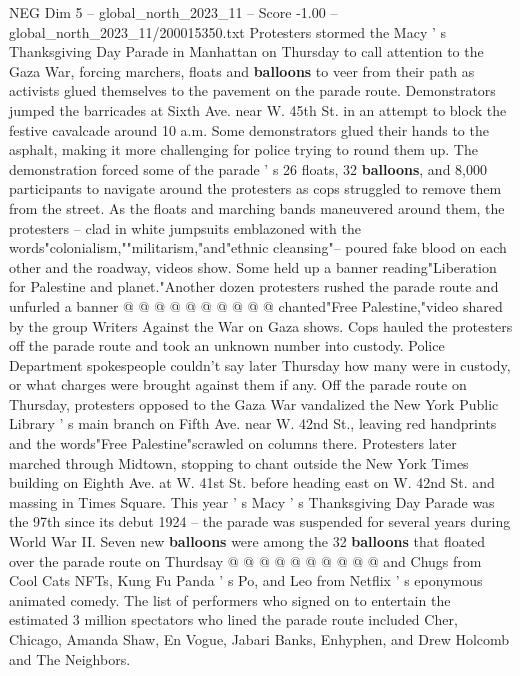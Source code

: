 \begin{textsample}{NEG Dim 5 – global\_north\_2023\_11 – Score -1.00 – global\_north\_2023\_11/200015350.txt}  \label{ex:f5_neg_042}
Protesters stormed the Macy ' s Thanksgiving Day Parade in Manhattan on Thursday to call attention to the Gaza War, forcing marchers, floats and \textbf{balloons} to veer from their path as activists glued themselves to the pavement on the parade route.
Demonstrators jumped the barricades at Sixth Ave. near W. 45th St. in an attempt to block the festive cavalcade around 10 a.m.
Some demonstrators glued their hands to the asphalt, making it more challenging for police trying to round them up.
The demonstration forced some of the parade ' s 26 floats, 32 \textbf{balloons}, and 8,000 participants to navigate around the protesters as cops struggled to remove them from the street.
As the floats and marching bands maneuvered around them, the protesters -- clad in white jumpsuits emblazoned with the words"colonialism,""militarism,"and"ethnic cleansing"-- poured fake blood on each other and the roadway, videos show.
Some held up a banner reading"Liberation for Palestine and planet."Another dozen protesters rushed the parade route and unfurled a banner @ @ @ @ @ @ @ @ @ @ chanted"Free Palestine,"video shared by the group Writers Against the War on Gaza shows.
Cops hauled the protesters off the parade route and took an unknown number into custody.
Police Department spokespeople couldn't say later Thursday how many were in custody, or what charges were brought against them if any.
Off the parade route on Thursday, protesters opposed to the Gaza War vandalized the New York Public Library ' s main branch on Fifth Ave. near W. 42nd St., leaving red handprints and the words"Free Palestine"scrawled on columns there.
Protesters later marched through Midtown, stopping to chant outside the New York Times building on Eighth Ave. at W. 41st St. before heading east on W. 42nd St. and massing in Times Square.
This year ' s Macy ' s Thanksgiving Day Parade was the 97th since its debut 1924 -- the parade was suspended for several years during World War II.
Seven new \textbf{balloons} were among the 32 \textbf{balloons} that floated over the parade route on Thurdsay @ @ @ @ @ @ @ @ @ @ and Chugs from Cool Cats NFTs, Kung Fu Panda ' s Po, and Leo from Netflix ' s eponymous animated comedy.
The list of performers who signed on to entertain the estimated 3 million spectators who lined the parade route included Cher, Chicago, Amanda Shaw, En Vogue, Jabari Banks, Enhyphen, and Drew Holcomb and The Neighbors.

\end{textsample}

